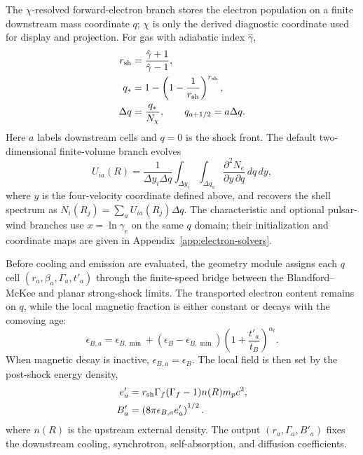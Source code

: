 \documentclass[twocolumn]{aastex702}
\begin{document}
The \(\chi\)-resolved forward-electron branch stores the electron population on
a finite downstream mass coordinate \(q\); \(\chi\) is only the derived diagnostic
coordinate used for display and projection.  For gas with adiabatic index
\(\hat\gamma\),
\begin{equation}
\begin{aligned}
r_{\rm sh}&=\frac{\hat\gamma+1}{\hat\gamma-1},\\
q_\ast&=1-\left(1-\frac{1}{r_{\rm sh}}\right)^{r_{\rm sh}},\\
\Delta q&=\frac{q_\ast}{N_\chi},\qquad
q_{a+1/2}=a\Delta q .
\end{aligned}
\end{equation}
Here \(a\) labels downstream cells and \(q=0\) is the shock front.  The default
two-dimensional finite-volume branch evolves
\begin{equation}
U_{ia}(R)=\frac{1}{\Delta y_i\Delta q}
\int_{\Delta y_i}\int_{\Delta q_a}
\frac{\partial^2 N_e}{\partial y\,\partial q}\,dq\,dy ,
\end{equation}
where \(y\) is the four-velocity coordinate defined above, and recovers the
shell spectrum as \(N_i(R_j)=\sum_a U_{ia}(R_j)\Delta q\).  The characteristic
and optional pulsar-wind branches use \(x=\ln\gamma_e\) on the same \(q\) domain;
their initialization and coordinate maps are given in
Appendix~\ref{app:electron-solvers}.

Before cooling and emission are evaluated, the geometry module assigns each
\(q\) cell \((r_a,\beta_a,\Gamma_a,t'_a)\) through the finite-speed bridge between
the Blandford--McKee and planar strong-shock limits.  The transported electron
content remains on \(q\), while the local magnetic fraction is either constant or
decays with the comoving age:
\begin{equation}
\epsilon_{B,a}=\epsilon_{B,\min}
 +(\epsilon_B-\epsilon_{B,\min})
\left(1+\frac{t'_a}{t_B}\right)^{\alpha_t}.
\end{equation}
When magnetic decay is inactive, \(\epsilon_{B,a}=\epsilon_B\).  The local field
is then set by the post-shock energy density,
\begin{equation}
\begin{aligned}
e'_a&=r_{\rm sh}\Gamma_f(\Gamma_f-1)n(R)m_p c^2,\\
B'_a&=\left(8\pi\epsilon_{B,a}e'_a\right)^{1/2}.
\end{aligned}
\end{equation}
where \(n(R)\) is the upstream external density.  The output
\((r_a,\Gamma_a,B'_a)\) fixes the downstream cooling, synchrotron,
self-absorption, and diffusion coefficients.
\end{document}
